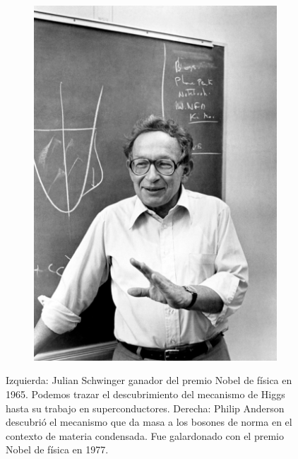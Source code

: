 \begin{figure}
\begin{subfigure}{0.5\textwidth}
		\includegraphics[trim = {1cm 1cm 4cm 12cm},clip,scale=0.25]{images/anderson.jpg}
		\end{subfigure}

		\caption{Izquierda: Julian Schwinger ganador del premio Nobel de f\'isica en 1965. Podemos trazar el descubrimiento del mecanismo de Higgs hasta su trabajo en superconductores. Derecha: Philip Anderson descubri\'o el mecanismo que da masa a los bosones de norma en el contexto de materia condensada. Fue galardonado con el premio Nobel de f\'isica en 1977.}
	\end{figure}


